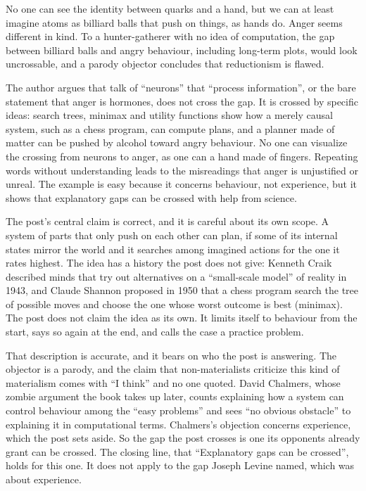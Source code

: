 \begin{afterword}
\summaryhead

No one can see the identity between quarks and a hand, but we can at least imagine atoms as billiard balls that push on things, as hands do. Anger seems different in kind. To a hunter-gatherer with no idea of computation, the gap between billiard balls and angry behaviour, including long-term plots, would look uncrossable, and a parody objector concludes that reductionism is flawed.

The author argues that talk of ``neurons'' that ``process information'', or the bare statement that anger is hormones, does not cross the gap. It is crossed by specific ideas: search trees, minimax and utility functions show how a merely causal system, such as a chess program, can compute plans, and a planner made of matter can be pushed by alcohol toward angry behaviour. No one can visualize the crossing from neurons to anger, as one can a hand made of fingers. Repeating words without understanding leads to the misreadings that anger is unjustified or unreal. The example is easy because it concerns behaviour, not experience, but it shows that explanatory gaps can be crossed with help from science.

\responsehead

The post's central claim is correct, and it is careful about its own scope. A system of parts that only push on each other can plan, if some of its internal states mirror the world and it searches among imagined actions for the one it rates highest. The idea has a history the post does not give: Kenneth Craik described minds that try out alternatives on a ``small-scale model'' of reality in 1943, and Claude Shannon proposed in 1950 that a chess program search the tree of possible moves and choose the one whose worst outcome is best (minimax). The post does not claim the idea as its own. It limits itself to behaviour from the start, says so again at the end, and calls the case a practice problem.

That description is accurate, and it bears on who the post is answering. The objector is a parody, and the claim that non-materialists criticize this kind of materialism comes with ``I think'' and no one quoted. David Chalmers, whose zombie argument the book takes up later, counts explaining how a system can control behaviour among the ``easy problems'' and sees ``no obvious obstacle'' to explaining it in computational terms. Chalmers's objection concerns experience, which the post sets aside. So the gap the post crosses is one its opponents already grant can be crossed. The closing line, that ``Explanatory gaps can be crossed'', holds for this one. It does not apply to the gap Joseph Levine named, which was about experience.


\end{afterword}
